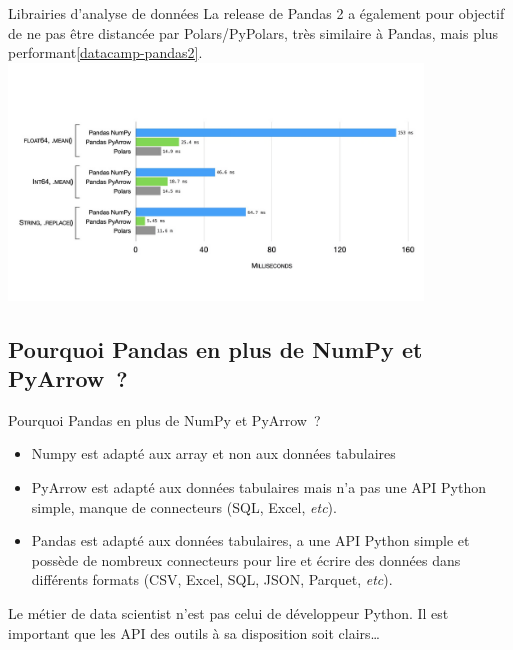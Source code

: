 \documentclass{beamer}
\begin{document}
    \begin{frame}{Librairies d'analyse de données}
        La release de Pandas 2 a également pour objectif de ne pas être distancée par Polars/PyPolars, très similaire à Pandas, mais plus performant\cref{datacamp-pandas2}.
        \bigbreak
        \centering
        \includegraphics[width=11cm]{image/pandas-numpy-arrrow-polars}
    \end{frame}

    \subsection{Pourquoi Pandas en plus de NumPy et PyArrow~?}

    \begin{frame}{Pourquoi Pandas en plus de NumPy et PyArrow~?}
        \begin{itemize}
            \item Numpy est adapté aux array et non aux données tabulaires
            \item PyArrow est adapté aux données tabulaires mais n'a pas une API Python simple, manque de connecteurs (SQL, Excel, \textit{etc}).
            \item Pandas est adapté aux données tabulaires, a une API Python simple et possède de nombreux connecteurs pour lire et écrire des données dans différents formats (CSV, Excel, SQL, JSON, Parquet, \textit{etc}).
        \end{itemize}
        \bigbreak
        \begin{dangercolorbox}
            Le métier de data scientist n'est pas celui de développeur Python.
            Il est important que les API des outils à sa disposition soit clairs\ldots
        \end{dangercolorbox}
    \end{frame}
\end{document}
